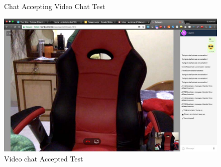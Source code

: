 \begin{itemize}
\begin{figure}[ht]
\caption{Chat Accepting Video Chat Test}
\end{figure}
\begin{figure}[ht]
\centering
\includegraphics[scale=0.3]{input/images/s33.png}
\caption{Video chat Accepted Test}
\end{figure}
\end{itemize}